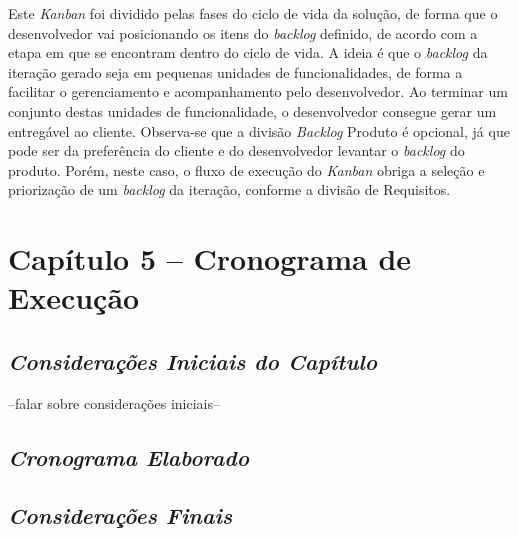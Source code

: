 Este \textit{Kanban} foi dividido pelas fases do ciclo de vida da solução, de forma que o desenvolvedor vai posicionando os itens do \textit{backlog} definido, de acordo com a etapa em que se encontram dentro do ciclo de vida. A ideia é que o \textit{backlog} da iteração gerado seja em pequenas unidades de funcionalidades, de forma a facilitar o gerenciamento e acompanhamento pelo desenvolvedor. Ao terminar um conjunto destas unidades de funcionalidade, o desenvolvedor consegue gerar um entregável ao cliente. Observa-se que a divisão \textit{Backlog} Produto é opcional, já que pode ser da preferência do cliente e do desenvolvedor levantar o \textit{backlog} do produto. Porém, neste caso, o fluxo de execução do \textit{Kanban} obriga a seleção e priorização de um \textit{backlog} da iteração, conforme a divisão de Requisitos.

\chapter[Capítulo 5 – Cronograma de Execução]{Capítulo 5 – Cronograma de Execução}

\section{\textit{Considerações Iniciais do Capítulo}}

--falar sobre considerações iniciais--

\section{\textit{Cronograma Elaborado}}

\section{\textit{Considerações Finais}}